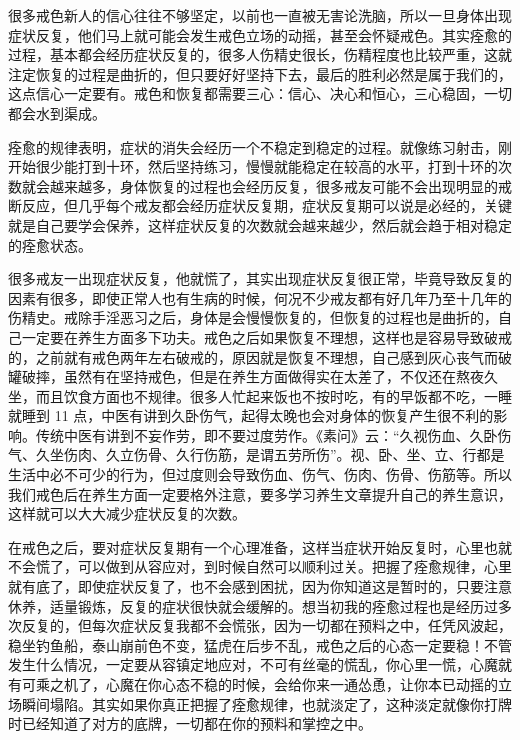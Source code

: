 \documentclass[fontset=founder]{ctexart}
\begin{document}
很多戒色新人的信心往往不够坚定，以前也一直被无害论洗脑，所以一旦身体出现症状反复，他们马上就可能会发生戒色立场的动摇，甚至会怀疑戒色。其实痊愈的过程，基本都会经历症状反复的，很多人伤精史很长，伤精程度也比较严重，这就注定恢复的过程是曲折的，但只要好好坚持下去，最后的胜利必然是属于我们的，这点信心一定要有。戒色和恢复都需要三心：信心、决心和恒心，三心稳固，一切都会水到渠成。

痊愈的规律表明，症状的消失会经历一个不稳定到稳定的过程。就像练习射击，刚开始很少能打到十环，然后坚持练习，慢慢就能稳定在较高的水平，打到十环的次数就会越来越多，身体恢复的过程也会经历反复，很多戒友可能不会出现明显的戒断反应，但几乎每个戒友都会经历症状反复期，症状反复期可以说是必经的，关键就是自己要学会保养，这样症状反复的次数就会越来越少，然后就会趋于相对稳定的痊愈状态。

很多戒友一出现症状反复，他就慌了，其实出现症状反复很正常，毕竟导致反复的因素有很多，即使正常人也有生病的时候，何况不少戒友都有好几年乃至十几年的伤精史。戒除手淫恶习之后，身体是会慢慢恢复的，但恢复的过程也是曲折的，自己一定要在养生方面多下功夫。戒色之后如果恢复不理想，这样也是容易导致破戒的，之前就有戒色两年左右破戒的，原因就是恢复不理想，自己感到灰心丧气而破罐破摔，虽然有在坚持戒色，但是在养生方面做得实在太差了，不仅还在熬夜久坐，而且饮食方面也不规律。很多人忙起来饭也不按时吃，有的早饭都不吃，一睡就睡到 11 点，中医有讲到久卧伤气，起得太晚也会对身体的恢复产生很不利的影响。传统中医有讲到不妄作劳，即不要过度劳作。《素问》云：“久视伤血、久卧伤气、久坐伤肉、久立伤骨、久行伤筋，是谓五劳所伤”。视、卧、坐、立、行都是生活中必不可少的行为，但过度则会导致伤血、伤气、伤肉、伤骨、伤筋等。所以我们戒色后在养生方面一定要格外注意，要多学习养生文章提升自己的养生意识，这样就可以大大减少症状反复的次数。

在戒色之后，要对症状反复期有一个心理准备，这样当症状开始反复时，心里也就不会慌了，可以做到从容应对，到时候自然可以顺利过关。把握了痊愈规律，心里就有底了，即使症状反复了，也不会感到困扰，因为你知道这是暂时的，只要注意休养，适量锻炼，反复的症状很快就会缓解的。想当初我的痊愈过程也是经历过多次反复的，但每次症状反复我都不会慌张，因为一切都在预料之中，任凭风波起，稳坐钓鱼船，泰山崩前色不变，猛虎在后步不乱，戒色之后的心态一定要稳！不管发生什么情况，一定要从容镇定地应对，不可有丝毫的慌乱，你心里一慌，心魔就有可乘之机了，心魔在你心态不稳的时候，会给你来一通怂恿，让你本已动摇的立场瞬间塌陷。其实如果你真正把握了痊愈规律，也就淡定了，这种淡定就像你打牌时已经知道了对方的底牌，一切都在你的预料和掌控之中。
\end{document}
